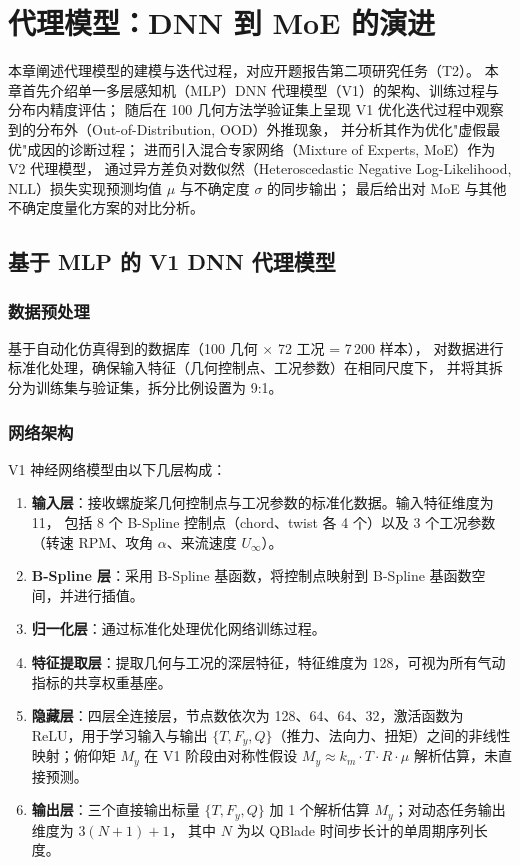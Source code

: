 
\chapter{代理模型：DNN 到 MoE 的演进}
\label{chap:surrogate}

本章阐述代理模型的建模与迭代过程，对应开题报告第二项研究任务（T2）。
本章首先介绍单一多层感知机（MLP）DNN 代理模型（V1）的架构、训练过程与分布内精度评估；
随后在 100 几何方法学验证集上呈现 V1 优化迭代过程中观察到的分布外（Out-of-Distribution, OOD）外推现象，
并分析其作为优化"虚假最优"成因的诊断过程；
进而引入混合专家网络（Mixture of Experts, MoE）作为 V2 代理模型，
通过异方差负对数似然（Heteroscedastic Negative Log-Likelihood, NLL）损失实现预测均值 $\mu$ 与不确定度 $\sigma$ 的同步输出；
最后给出对 MoE 与其他不确定度量化方案的对比分析。

\section{基于 MLP 的 V1 DNN 代理模型}

\subsection{数据预处理}

基于自动化仿真得到的数据库（100 几何 $\times$ 72 工况 = 7\,200 样本），
对数据进行标准化处理，确保输入特征（几何控制点、工况参数）在相同尺度下，
并将其拆分为训练集与验证集，拆分比例设置为 9:1。

\subsection{网络架构}

V1 神经网络模型由以下几层构成：
\begin{enumerate}
  \item \textbf{输入层}：接收螺旋桨几何控制点与工况参数的标准化数据。输入特征维度为 11，
        包括 8 个 B-Spline 控制点（chord、twist 各 4 个）以及 3 个工况参数（转速 RPM、攻角 $\alpha$、来流速度 $U_\infty$）。
  \item \textbf{B-Spline 层}：采用 B-Spline 基函数，将控制点映射到 B-Spline 基函数空间，并进行插值。
  \item \textbf{归一化层}：通过标准化处理优化网络训练过程。
  \item \textbf{特征提取层}：提取几何与工况的深层特征，特征维度为 128，可视为所有气动指标的共享权重基座。
  \item \textbf{隐藏层}：四层全连接层，节点数依次为 128、64、64、32，激活函数为 ReLU，用于学习输入与输出 $\{T, F_y, Q\}$（推力、法向力、扭矩）之间的非线性映射；俯仰矩 $M_y$ 在 V1 阶段由对称性假设 $M_y \approx k_m \cdot T \cdot R \cdot \mu$ 解析估算，未直接预测。
  \item \textbf{输出层}：三个直接输出标量 $\{T, F_y, Q\}$ 加 1 个解析估算 $M_y$；对动态任务输出维度为 $3(N+1) + 1$，
        其中 $N$ 为以 QBlade 时间步长计的单周期序列长度。
\end{enumerate}

